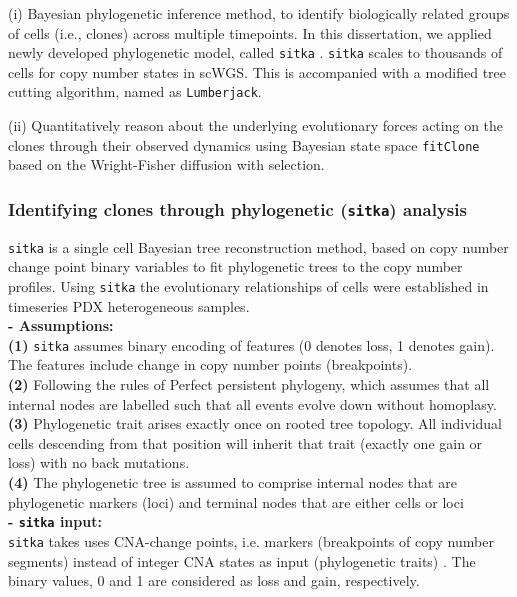  (i) Bayesian phylogenetic inference method, to identify biologically related groups of cells (i.e., clones) across multiple timepoints. 
 In this dissertation, we applied newly developed phylogenetic model, called \texttt{sitka} \cite{dorri2020efficient}. \texttt{sitka} scales to thousands of cells for copy number states in scWGS. This is accompanied with a modified tree cutting algorithm, named as \texttt{Lumberjack}.

(ii) Quantitatively reason about the underlying evolutionary
forces acting on the clones through their observed dynamics
 using Bayesian state space \texttt{fitClone}  based on the Wright-Fisher diffusion with selection.

\subsubsection{Identifying clones through phylogenetic (\texttt{sitka}) analysis \cite{dorri2020efficient, salehi2020single}}
\texttt{sitka} is a single cell Bayesian tree reconstruction method, based on copy number change point binary variables \cite{dorri2020efficient} to fit phylogenetic trees to the copy number profiles. Using \texttt{sitka} the evolutionary relationships of cells were established in timeseries PDX heterogeneous samples. 
\\
\textbf{- Assumptions:} 
\\
\textbf{(1)} \texttt{sitka} assumes binary encoding of features (0 denotes loss, 1 denotes gain). The features include change in copy number points (breakpoints). 
\\
\textbf{(2)} Following the rules of Perfect persistent phylogeny, which assumes that all internal nodes are labelled such that all events evolve down without homoplasy. 
\\
\textbf{(3)} Phylogenetic trait arises exactly once on rooted tree topology. All individual cells descending from that position will inherit that trait (exactly one gain or loss) with no back mutations.
\\
\textbf{(4)} The phylogenetic tree is assumed to comprise internal nodes that are phylogenetic markers (loci) and terminal nodes that are either cells or loci
\\
\textbf{- \texttt{sitka} \textbf{input:} }
\\
\texttt{sitka} takes uses CNA-change points, i.e. markers  (breakpoints of copy number segments) instead of integer CNA states as input (phylogenetic traits) \cite{dorri2020efficient}. The binary  values, 0 and 1 are considered as loss and gain, respectively.
